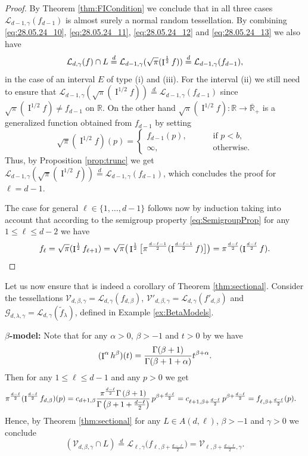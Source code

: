 \documentclass[11pt,a4paper]{article}
\theoremstyle{plain}
\theoremstyle{definition}
\theoremstyle{remark}
\def\RR{\mathbb{R}}
\def\cG{\mathcal{G}}
\def\cL{\mathcal{L}}
\def\cV{\mathcal{V}}
\newcommand{\frI}{\mathop{\mathrm{I}}\nolimits}
\begin{document}
\begin{proof}
    By Theorem \ref{thm:FICondition} we conclude that in all three cases $\cL_{d-1,\gamma}(f_{d-1})$ is almost surely a normal random tessellation. By combining \eqref{eq:28.05.24_10}, \eqref{eq:28.05.24_11}, \eqref{eq:28.05.24_12} and \eqref{eq:28.05.24_13} we also have
    $$
        \cL_{d,\gamma}(f)\cap L\overset{d}{=}\cL_{d-1,\gamma}(\sqrt{\pi} (\frI^{1\over 2}f))\overset{d}{=}\cL_{d-1,\gamma}(f_{d-1}),
    $$
    in the case of an interval $E$ of type (i) and (iii). For the interval (ii) we still need to ensure that $\cL_{d-1,\gamma}(\sqrt{\pi} (\frI^{1/2}f))\overset{d}{=}\cL_{d-1,\gamma}(f_{d-1})$ since $\sqrt{\pi} (\frI^{1/2}f)\neq f_{d-1}$ on $\RR$. On the other hand $\sqrt{\pi} (\frI^{1/2}f)\colon \RR\to\overline{\RR}_+$ is a generalized function obtained from $f_{d-1}$ by setting 
    $$
        \sqrt{\pi} (\frI^{1/2}f)(p)=\begin{cases}
            f_{d-1}(p),\qquad &\text{ if } p<b,\\
            \infty,\qquad &\text{ otherwise}.
        \end{cases}
    $$
    Thus, by Proposition \ref{prop:trunc} we get $\cL_{d-1,\gamma}(\sqrt{\pi} (\frI^{1/2}f))\overset{d}{=}\cL_{d-1,\gamma}(f_{d-1})$, which concludes the proof for $\ell=d-1$.

    The case for general $\ell\in \{1,\dots,d-1\}$ follows now by induction taking into account that according to the semigroup property \eqref{eq:SemigroupProp} for any $1\leq \ell\leq d-2$ we have
    $$
        f_{\ell}=\sqrt{\pi}(\frI^{1\over 2}f_{\ell+1})=\sqrt{\pi}\big(\frI^{1\over 2}\big[\pi^{d-\ell-1\over 2}(\frI^{d-\ell-1\over 2}f)\big]\big)=\pi^{d-\ell\over 2}(\frI^{d-\ell\over 2}f).
    $$

    
\end{proof}

Let us now ensure that \cite[Theorem~4.1]{sectional} is indeed a corollary of Theorem \ref{thm:sectional}. Consider the tessellations $\cV_{d,\beta,\gamma}=\cL_{d,\gamma}(f_{d,\beta})$, $\cV'_{d,\beta,\gamma}=\cL_{d,\gamma}(f'_{d,\beta})$ and $\cG_{d,\lambda,\gamma}=\cL_{d,\gamma}(\widetilde f_{\lambda})$, defined in Example \ref{ex:BetaModels}.

\medskip

\textbf{$\beta$-model:} Note that for any $\alpha>0$, $\beta>-1$ and $t>0$ by \cite[Property 2.5(a)]{TAFDE} we have 
$$
    (\frI^{\alpha} h^{\beta})(t)={\Gamma(\beta+1)\over \Gamma(\beta+1+\alpha)}t^{\beta+\alpha}.
$$
Then for any $1\leq \ell\leq d-1$ and any $p>0$ we get
\begin{align*}
    \pi^{d-\ell\over 2}(\frI^{d-\ell\over 2}f_{d,\beta})(p) &= c_{d+1,\beta} \frac{\pi^{\frac{d-\ell}{2}}\Gamma\left(\beta + 1\right)}{\Gamma\left(\beta+1+\frac{d-\ell}{2}\right)}\, p^{\beta+\frac{d-\ell}{2}}= c_{\ell+1,\beta+\frac{d-\ell}{2}}\, p^{\beta+\frac{d-\ell}{2}}=f_{\ell,\beta+\frac{d-\ell}{2}}(p).
\end{align*}
Hence, by Theorem \ref{thm:sectional} for any $L\in A(d,\ell)$, $\beta>-1$ and $\gamma>0$ we conclude
\[
    (\cV_{d,\beta,\gamma}\cap L)\overset{d}{=}\cL_{\ell,\gamma}\big(f_{\ell,\beta+\frac{d-\ell}{2}}\big)=\cV_{\ell,\beta+\frac{d-\ell}{2},\gamma}.
\]
\end{document}
